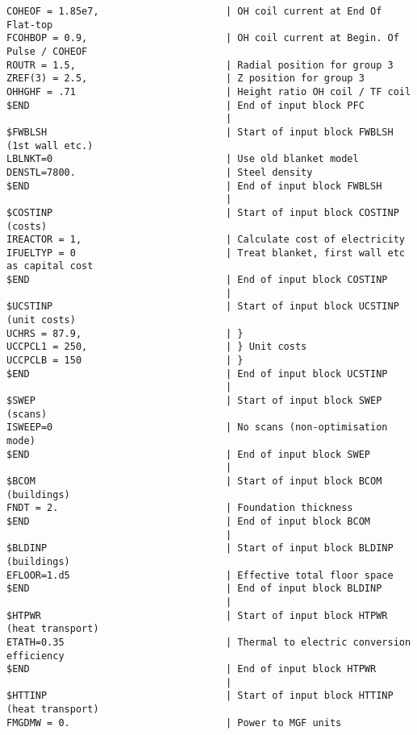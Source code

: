 \begin{verbatim}
COHEOF = 1.85e7,                      | OH coil current at End Of Flat-top
FCOHBOP = 0.9,                        | OH coil current at Begin. Of Pulse / COHEOF
ROUTR = 1.5,                          | Radial position for group 3
ZREF(3) = 2.5,                        | Z position for group 3
OHHGHF = .71                          | Height ratio OH coil / TF coil
$END                                  | End of input block PFC
                                      | 
$FWBLSH                               | Start of input block FWBLSH (1st wall etc.)
LBLNKT=0                              | Use old blanket model
DENSTL=7800.                          | Steel density
$END                                  | End of input block FWBLSH
                                      | 
$COSTINP                              | Start of input block COSTINP (costs)
IREACTOR = 1,                         | Calculate cost of electricity
IFUELTYP = 0                          | Treat blanket, first wall etc as capital cost
$END                                  | End of input block COSTINP
                                      | 
$UCSTINP                              | Start of input block UCSTINP (unit costs)
UCHRS = 87.9,                         | }
UCCPCL1 = 250,                        | } Unit costs
UCCPCLB = 150                         | }
$END                                  | End of input block UCSTINP
                                      | 
$SWEP                                 | Start of input block SWEP (scans)
ISWEEP=0                              | No scans (non-optimisation mode)
$END                                  | End of input block SWEP
                                      | 
$BCOM                                 | Start of input block BCOM (buildings)
FNDT = 2.                             | Foundation thickness
$END                                  | End of input block BCOM
                                      | 
$BLDINP                               | Start of input block BLDINP (buildings)
EFLOOR=1.d5                           | Effective total floor space
$END                                  | End of input block BLDINP
                                      | 
$HTPWR                                | Start of input block HTPWR (heat transport)
ETATH=0.35                            | Thermal to electric conversion efficiency
$END                                  | End of input block HTPWR
                                      | 
$HTTINP                               | Start of input block HTTINP (heat transport)
FMGDMW = 0.                           | Power to MGF units

\end{verbatim}

